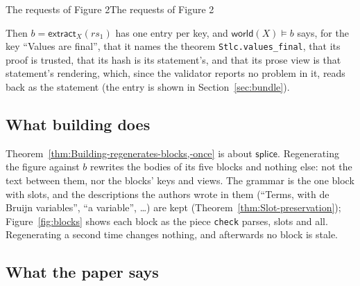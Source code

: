 \documentclass[acmsmall,screen,review,anonymous,nonacm]{acmart}
\begin{document}
\begin{leandef}[sum=XRzcN--NQb, dflt=2j7fTRiy7H]{The requests of Figure 2}{The requests of Figure 2}
\begin{LeanDisplay}
\end{LeanDisplay}
\end{leandef}

\noindent Then $b = \mathsf{extract}_{X}(\mathit{rs}_{1})$ has one entry per key, and $\mathsf{world}(X) \models b$ says,
for the key ``Values are final'', that it names the theorem
\texttt{Stlc.values\_final}, that its proof is trusted, that its hash is
its statement's, and that its prose view is that statement's rendering,
which, since the validator reports no problem in it, reads back as the
statement (the entry is shown in Section~\ref{sec:bundle}).

\subsection{What building does}\label{sec:example-build}

Theorem~\ref{thm:Building-regenerates-blocks,-once} is about
$\mathsf{splice}$. Regenerating the figure against $b$ rewrites the bodies
of its five blocks and nothing else: not the text between them, nor the
blocks' keys and views. The grammar is the one block with slots, and the
descriptions the authors wrote in them (``Terms, with de Bruijn
variables'', ``a variable'', \ldots) are kept
(Theorem~\ref{thm:Slot-preservation}); Figure~\ref{fig:blocks}
shows each block as the piece \texttt{check} parses, slots and all.
Regenerating a second time changes nothing, and afterwards no block is
stale.

\subsection{What the paper says}\label{sec:example-paper}
\end{document}
